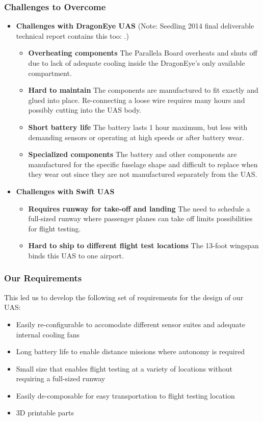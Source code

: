 \documentclass[]{article}
\begin{document}
\subsubsection{Challenges to Overcome}
\begin{itemize}

\item {\bf Challenges with DragonEye UAS} (Note: Seedling 2014 final deliverable technical report contains this too: \cite{RSI15}.)
  \begin{itemize}
    \item {\bf Overheating components} The Parallela Board overheats and shuts off due to lack of adequate cooling inside the DragonEye's only available compartment.
    \item {\bf Hard to maintain} The components are manufactured to fit exactly and glued into place. Re-connecting a loose wire requires many hours and possibly cutting into the UAS body.
    \item {\bf Short battery life} The battery lasts 1 hour maximum, but less with demanding sensors or operating at high speeds or after battery wear.
    \item {\bf Specialized components} The battery and other components are manufactured for the specific fuselage shape and difficult to replace when they wear out since they are not manufactured separately from the UAS.
  \end{itemize}

\item {\bf Challenges with Swift UAS}
  \begin{itemize}
    \item {\bf Requires runway for take-off and landing} The need to schedule a full-sized runway where passenger planes can take off limits possibilities for flight testing.
    \item {\bf Hard to ship to different flight test locations} The 13-foot wingspan binds this UAS to one airport.
  \end{itemize}

\end{itemize}


\subsubsection{Our Requirements}
This led us to develop the following set of requirements for the design of our UAS:

\begin{itemize}
  \item Easily re-configurable to accomodate different sensor suites and adequate internal cooling fans
  \item Long battery life to enable distance missions where autonomy is required
  \item Small size that enables flight testing at a variety of locations without requiring a full-sized runway
  \item Easily de-composable for easy transportation to flight testing location
  \item 3D printable parts
\end{itemize}
\end{document}
